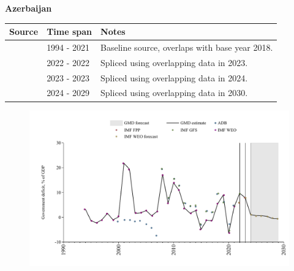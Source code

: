 \documentclass[12pt,a4paper,landscape]{article}
\begin{document}
\begin{adjustbox}{max totalsize={\paperwidth}{\paperheight},center}
\begin{minipage}[t][\textheight][t]{\textwidth}
\vspace*{0.5cm}
{}
\begin{center}
{\Large\bfseries Azerbaijan}
\end{center}
\vspace{0.5cm}
\begin{table}[H]
\centering
\small
\begin{tabular}{|l|l|l|}
\hline
\textbf{Source} & \textbf{Time span} & \textbf{Notes} \\
\hline
\rowcolor{white}\cite{IMF_WEO}& 1994 - 2021 &Baseline source, overlaps with base year 2018.\\
\rowcolor{lightgray}\cite{IMF_GFS}& 2022 - 2022 &Spliced using overlapping data in 2023.\\
\rowcolor{white}\cite{IMF_FPP}& 2023 - 2023 &Spliced using overlapping data in 2024.\\
\rowcolor{lightgray}\cite{IMF_WEO_forecast}& 2024 - 2029 &Spliced using overlapping data in 2030.\\
\hline
\end{tabular}
\end{table}
\begin{figure}[H]
\centering
\includegraphics[width=\textwidth,height=0.6\textheight,keepaspectratio]{graphs/AZE_govdef_GDP.pdf}
\end{figure}
\end{minipage}
\end{adjustbox}
\end{document}
